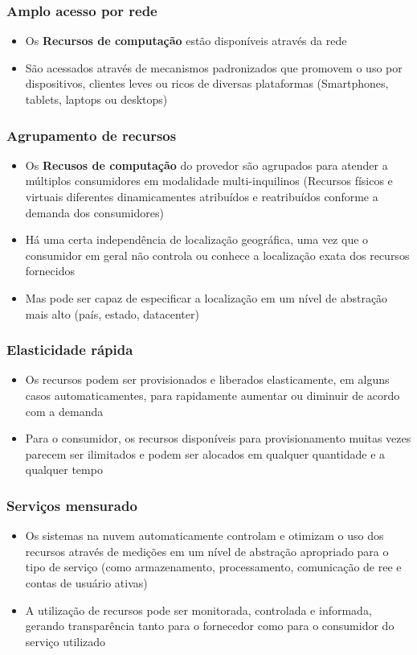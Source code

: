 \begin{frame}
	\frametitle{Amplo acesso por rede}
	\begin{itemize}
		\item Os \textbf{Recursos de computação} estão disponíveis através da rede
		\item São acessados através de mecanismos padronizados que promovem o uso por dispositivos, clientes leves ou ricos de diversas plataformas (Smartphones, tablets, laptops ou desktops)
	\end{itemize}
\end{frame}

\begin{frame}
	\frametitle{Agrupamento de recursos}
	\begin{itemize}
		\item Os \textbf{Recusos de computação} do provedor são agrupados para atender a múltiplos consumidores em modalidade multi-inquilinos (Recursos físicos e virtuais diferentes dinamicamentes atribuídos e reatribuídos conforme a demanda dos consumidores)
		\item Há uma certa independência de localização geográfica, uma vez que o consumidor em geral não controla ou conhece a localização exata dos recursos fornecidos
		\item Mas pode ser capaz de especificar a localização em um nível de abstração mais alto (país, estado, datacenter)
	\end{itemize}
\end{frame}

\begin{frame}
	\frametitle{Elasticidade rápida}
	\begin{itemize}
		\item Os recursos podem ser provisionados e liberados elasticamente, em alguns casos automaticamentes, para rapidamente aumentar ou diminuir de acordo com a demanda
		\item Para o consumidor, os recursos disponíveis para provisionamento muitas vezes parecem ser ilimitados e podem ser alocados em qualquer quantidade e a qualquer tempo
	\end{itemize}
\end{frame}

\begin{frame}
	\frametitle{Serviços mensurado}
	\begin{itemize}
		\item Os sistemas na nuvem automaticamente controlam e otimizam o uso dos recursos através de medições em um nível de abstração apropriado para o tipo de serviço (como armazenamento, processamento, comunicação de ree e contas de usuário ativas)
		\item A utilização de recursos pode ser monitorada, controlada e informada, gerando transparência tanto para o fornecedor como para o consumidor do serviço utilizado
	\end{itemize}
\end{frame}
